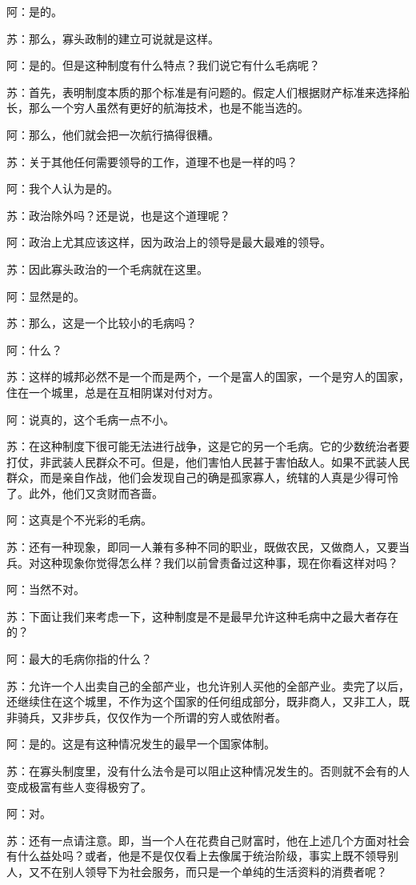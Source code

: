 \documentclass[12pt,oneside]{book}
\begin{document}
阿：是的。

苏：那么，寡头政制的建立可说就是这样。

阿：是的。但是这种制度有什么特点？我们说它有什么毛病呢？

苏：首先，表明制度本质的那个标准是有问题的。假定人们根据财产标准来选择船长，那么一个穷人虽然有更好的航海技术，也是不能当选的。

阿：那么，他们就会把一次航行搞得很糟。

苏：关于其他任何需要领导的工作，道理不也是一样的吗？

阿：我个人认为是的。

苏：政治除外吗？还是说，也是这个道理呢？

阿：政治上尤其应该这样，因为政治上的领导是最大最难的领导。

苏：因此寡头政治的一个毛病就在这里。

阿：显然是的。

苏：那么，这是一个比较小的毛病吗？

阿：什么？

苏：这样的城邦必然不是一个而是两个，一个是富人的国家，一个是穷人的国家，住在一个城里，总是在互相阴谋对付对方。

阿：说真的，这个毛病一点不小。

苏：在这种制度下很可能无法进行战争，这是它的另一个毛病。它的少数统治者要打仗，非武装人民群众不可。但是，他们害怕人民甚于害怕敌人。如果不武装人民群众，而是亲自作战，他们会发现自己的确是孤家寡人，统辖的人真是少得可怜了。此外，他们又贪财而吝啬。

阿：这真是个不光彩的毛病。

苏：还有一种现象，即同一人兼有多种不同的职业，既做农民，又做商人，又要当兵。对这种现象你觉得怎么样？我们以前曾责备过这种事，现在你看这样对吗？

阿：当然不对。

苏：下面让我们来考虑一下，这种制度是不是最早允许这种毛病中之最大者存在的？

阿：最大的毛病你指的什么？

苏：允许一个人出卖自己的全部产业，也允许别人买他的全部产业。卖完了以后，还继续住在这个城里，不作为这个国家的任何组成部分，既非商人，又非工人，既非骑兵，又非步兵，仅仅作为一个所谓的穷人或依附者。

阿：是的。这是有这种情况发生的最早一个国家体制。

苏：在寡头制度里，没有什么法令是可以阻止这种情况发生的。否则就不会有的人变成极富有些人变得极穷了。

阿：对。

苏：还有一点请注意。即，当一个人在花费自己财富时，他在上述几个方面对社会有什么益处吗？或者，他是不是仅仅看上去像属于统治阶级，事实上既不领导别人，又不在别人领导下为社会服务，而只是一个单纯的生活资料的消费者呢？
\end{document}
